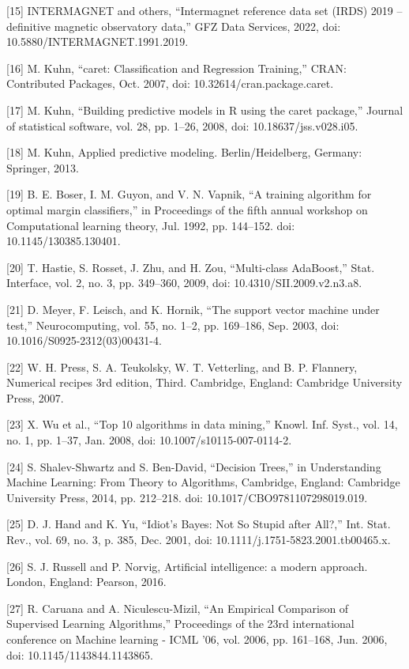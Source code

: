 \let\LaTeXcline\cline\documentclass[sn-mathphys-num]{sn-jnl}\let\cline\LaTeXcline
\begin{document}
[15] INTERMAGNET and others, “Intermagnet reference data set (IRDS) 2019 – definitive magnetic observatory data,” GFZ Data Services, 2022, doi: 10.5880/INTERMAGNET.1991.2019.

[16] M. Kuhn, “caret: Classification and Regression Training,” CRAN: Contributed Packages, Oct. 2007, doi: 10.32614/cran.package.caret.

[17] M. Kuhn, “Building predictive models in R using the caret package,” Journal of statistical software, vol. 28, pp. 1–26, 2008, doi: 10.18637/jss.v028.i05.

[18] M. Kuhn, Applied predictive modeling. Berlin/Heidelberg, Germany: Springer, 2013.

[19] B. E. Boser, I. M. Guyon, and V. N. Vapnik, “A training algorithm for optimal margin classifiers,” in Proceedings of the fifth annual workshop on Computational learning theory, Jul. 1992, pp. 144–152. doi: 10.1145/130385.130401.

[20] T. Hastie, S. Rosset, J. Zhu, and H. Zou, “Multi-class AdaBoost,” Stat. Interface, vol. 2, no. 3, pp. 349–360, 2009, doi: 10.4310/SII.2009.v2.n3.a8.

[21] D. Meyer, F. Leisch, and K. Hornik, “The support vector machine under test,” Neurocomputing, vol. 55, no. 1–2, pp. 169–186, Sep. 2003, doi: 10.1016/S0925-2312(03)00431-4.

[22] W. H. Press, S. A. Teukolsky, W. T. Vetterling, and B. P. Flannery, Numerical recipes 3rd edition, Third. Cambridge, England: Cambridge University Press, 2007.

[23] X. Wu et al., “Top 10 algorithms in data mining,” Knowl. Inf. Syst., vol. 14, no. 1, pp. 1–37, Jan. 2008, doi: 10.1007/s10115-007-0114-2.

[24] S. Shalev-Shwartz and S. Ben-David, “Decision Trees,” in Understanding Machine Learning: From Theory to Algorithms, Cambridge, England: Cambridge University Press, 2014, pp. 212–218. doi: 10.1017/CBO9781107298019.019.

[25] D. J. Hand and K. Yu, “Idiot’s Bayes: Not So Stupid after All?,” Int. Stat. Rev., vol. 69, no. 3, p. 385, Dec. 2001, doi: 10.1111/j.1751-5823.2001.tb00465.x.

[26] S. J. Russell and P. Norvig, Artificial intelligence: a modern approach. London, England: Pearson, 2016.

[27] R. Caruana and A. Niculescu-Mizil, “An Empirical Comparison of Supervised Learning Algorithms,” Proceedings of the 23rd international conference on Machine learning - ICML ’06, vol. 2006, pp. 161–168, Jun. 2006, doi: 10.1145/1143844.1143865.
\end{document}
